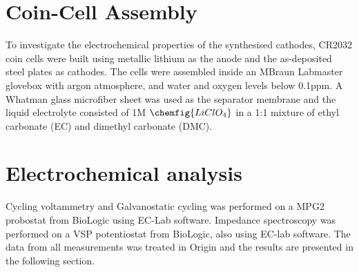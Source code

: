 \documentclass[Main/main.tex]{subfiles}
\begin{document}


\section{Coin-Cell Assembly}
To investigate the electrochemical properties of the synthesised cathodes, CR2032 coin cells were built using metallic lithium as the anode and the as-deposited steel plates as cathodes. The cells were assembled inside an MBraun Labmaster glovebox with argon atmosphere, and water and oxygen levels below 0.1ppm. A Whatman glass microfiber sheet was used as the separator membrane and the liquid electrolyte consisted of 1M $\chemfig{LiClO_4}$ in a 1:1 mixture of ethyl carbonate (EC) and dimethyl carbonate (DMC).

\section{Electrochemical analysis}
Cycling voltammetry and Galvanostatic cycling was performed on a MPG2 probostat from BioLogic using EC-Lab software. Impedance spectroscopy was performed on a VSP potentiostat from BioLogic, also using EC-lab software. The data from all measurements was treated in Origin and the results are presented in the following section.
\end{document}
